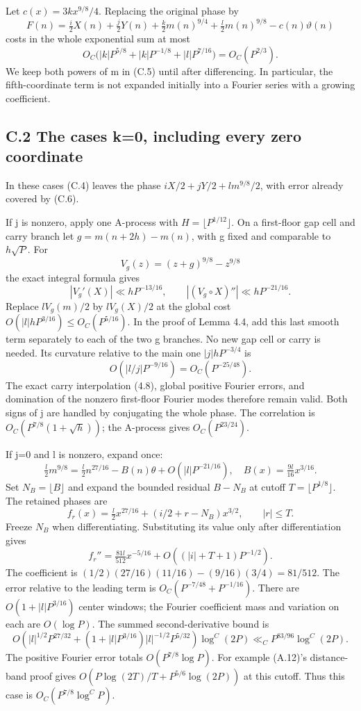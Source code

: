 \documentclass[11pt,a4paper]{article}
\begin{document}
Let \(c(x)=3kx^{9/8}/4\). Replacing the original phase by \[
F(n)=\tfrac i2X(n)+\tfrac j2Y(n)+\tfrac k2m(n)^{9/4}
+\tfrac l2m(n)^{9/8}-c(n)\vartheta(n) \tag{C.5}
\] costs in the whole exponential sum at most \[
O_C\bigl(|k|P^{5/8}+|k|P^{-1/8}+|l|P^{7/16}\bigr)
=O_C(P^{2/3}). \tag{C.6}
\] We keep both powers of m in (C.5) until after differencing. In
particular, the fifth-coordinate term is not expanded initially into a
Fourier series with a growing coefficient.

\subsection{C.2 The cases k=0, including every zero
coordinate}\label{c.2-the-cases-k0-including-every-zero-coordinate}

In these cases (C.4) leaves the phase \(iX/2+jY/2+l m^{9/8}/2\), with
error already covered by (C.6).

If j is nonzero, apply one A-process with \(H=\lfloor P^{1/12}\rfloor\).
On a first-floor gap cell and carry branch let \(g=m(n+2h)-m(n)\), with
g fixed and comparable to \(h\sqrt P\). For \[
V_g(z)=(z+g)^{9/8}-z^{9/8}
\] the exact integral formula gives \[
|V_g'(X)|\ll hP^{-13/16},\qquad
|(V_g\circ X)''|\ll hP^{-21/16}. \tag{C.7}
\] Replace \(lV_g(m)/2\) by \(lV_g(X)/2\) at the global cost
\(O(|l|hP^{3/16})\le O_C(P^{5/16})\). In the proof of Lemma 4.4, add
this last smooth term separately to each of the two g branches. No new
gap cell or carry is needed. Its curvature relative to the main one
\(|j|hP^{-3/4}\) is \[
O(|l/j|P^{-9/16})=O_C(P^{-25/48}).
\] The exact carry interpolation (4.8), global positive Fourier errors,
and domination of the nonzero first-floor Fourier modes therefore remain
valid. Both signs of j are handled by conjugating the whole phase. The
correlation is \(O_C(P^{7/8}(1+\sqrt h))\); the A-process gives
\(O_C(P^{23/24})\).

If j=0 and l is nonzero, expand once: \[
\tfrac l2m^{9/8}
=\tfrac l2n^{27/16}-B(n)\theta+O(|l|P^{-21/16}),
\quad B(x)=\tfrac{9l}{16}x^{3/16}. \tag{C.8}
\] Set \(N_B=\lfloor B\rfloor\) and expand the bounded residual
\(B-N_B\) at cutoff \(T=\lfloor P^{1/8}\rfloor\). The retained phases
are \[
f_r(x)=\tfrac l2x^{27/16}+(i/2+r-N_B)x^{3/2},\qquad |r|\le T.
\] Freeze \(N_B\) when differentiating. Substituting its value only
after differentiation gives \[
f_r''=\tfrac{81l}{512}x^{-5/16}
+O((|i|+T+1)P^{-1/2}). \tag{C.9}
\] The coefficient is \((1/2)(27/16)(11/16)-(9/16)(3/4)=81/512\). The
error relative to the leading term is \(O_C(P^{-7/48}+P^{-1/16})\).
There are \(O(1+|l|P^{3/16})\) center windows; the Fourier coefficient
mass and variation on each are \(O(\log P)\). The summed
second-derivative bound is \[
O\left(|l|^{1/2}P^{27/32}
+(1+|l|P^{3/16})|l|^{-1/2}P^{5/32}\right)\log^C(2P)
\ll_C P^{83/96}\log^C(2P).
\] The positive Fourier error totals \(O(P^{7/8}\log P)\). For example
(A.12)'s distance-band proof gives \(O(P\log(2T)/T+P^{5/6}\log(2P))\) at
this cutoff. Thus this case is \(O_C(P^{7/8}\log^C P)\).
\end{document}
